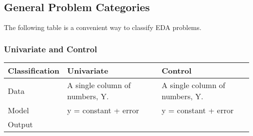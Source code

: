 \documentclass[]{book}
\theoremstyle{definition}
\theoremstyle{definition}
\theoremstyle{definition}
\theoremstyle{remark}
\begin{document}
\subsection{General Problem
Categories}\label{general-problem-categories}

The following table is a convenient way to classify EDA problems.

\subsubsection{Univariate and Control}\label{univariate-and-control}

\begin{longtable}[]{@{}lll@{}}
\toprule
\begin{minipage}[b]{0.14\columnwidth}\raggedright\strut
Classification\strut
\end{minipage} & \begin{minipage}[b]{0.39\columnwidth}\raggedright\strut
Univariate\strut
\end{minipage} & \begin{minipage}[b]{0.39\columnwidth}\raggedright\strut
Control\strut
\end{minipage}\tabularnewline
\midrule
\endhead
\begin{minipage}[t]{0.14\columnwidth}\raggedright\strut
Data\strut
\end{minipage} & \begin{minipage}[t]{0.39\columnwidth}\raggedright\strut
A single column of numbers, Y.\strut
\end{minipage} & \begin{minipage}[t]{0.39\columnwidth}\raggedright\strut
A single column of numbers, Y.\strut
\end{minipage}\tabularnewline
\begin{minipage}[t]{0.14\columnwidth}\raggedright\strut
Model\strut
\end{minipage} & \begin{minipage}[t]{0.39\columnwidth}\raggedright\strut
y = constant + error\strut
\end{minipage} & \begin{minipage}[t]{0.39\columnwidth}\raggedright\strut
y = constant + error\strut
\end{minipage}\tabularnewline
\begin{minipage}[t]{0.14\columnwidth}\raggedright\strut
Output\strut
\end{minipage} & \begin{minipage}[t]{0.39\columnwidth}\raggedright\strut

\end{minipage}
\end{longtable}
\end{document}
